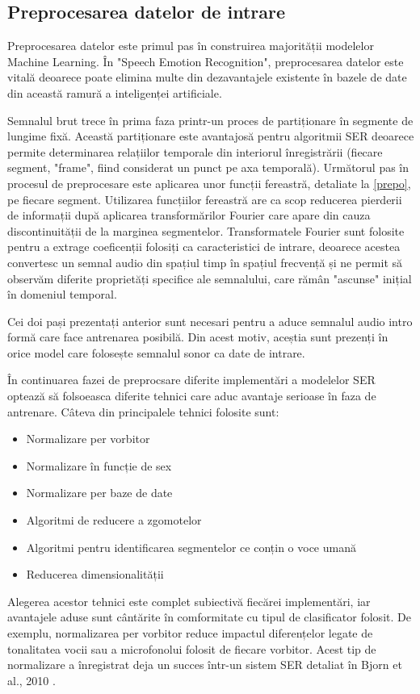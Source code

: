 \documentclass[a4paper,12pt]{book}
\begin{document}
					\subsection{Preprocesarea datelor de intrare}
						Preprocesarea datelor este primul pas în construirea majorității modelelor Machine Learning. În "Speech Emotion Recognition", preprocesarea datelor este vitală deoarece poate elimina multe din dezavantajele existente în bazele de date din această ramură a inteligenței artificiale.\par
						Semnalul brut trece în prima faza printr-un proces de partiționare în segmente de lungime fixă. Această partiționare este avantajosă pentru algoritmii SER deoarece permite determinarea relațiilor temporale din interiorul înregistrării (fiecare segment, "frame", fiind considerat un punct pe axa temporală). Următorul pas în procesul de preprocesare este aplicarea unor funcții fereastră, detaliate la \ref{prepo}, pe fiecare segment. Utilizarea funcțiilor fereastră are ca scop reducerea pierderii de informații după aplicarea transformărilor Fourier care apare din cauza discontinuității de la marginea segmentelor.
						Transformatele Fourier sunt folosite pentru a extrage coeficenții folosiți ca caracteristici de intrare, deoarece acestea convertesc un semnal audio din spațiul timp în spațiul frecvență și ne permit să observăm diferite proprietăți specifice ale semnalului, care rămân "ascunse" inițial în domeniul temporal. \par
						Cei doi pași prezentați anterior sunt necesari pentru a aduce semnalul audio intro formă care face antrenarea posibilă. Din acest motiv, aceștia sunt prezenți în orice model care folosește semnalul sonor ca date de intrare. \par
						În continuarea fazei de preprocsare diferite implementări a modelelor SER optează să folsoeasca diferite tehnici care aduc avantaje serioase în faza de antrenare. Câteva din principalele tehnici folosite sunt:
						\begin{itemize}
							\setlength\itemsep{0pt}
							\setlength{\itemindent}{1.5cm}
							\item Normalizare per vorbitor
							\item Normalizare în funcție de sex
							\item Normalizare per baze de date
							\item Algoritmi de reducere a zgomotelor
							\item Algoritmi pentru identificarea segmentelor ce conțin o voce umană
							\item Reducerea dimensionalității
						\end{itemize}	
						Alegerea acestor tehnici este complet subiectivă fiecărei implementări, iar avantajele aduse sunt cântărite în comformitate cu tipul de clasificator folosit. De exemplu, normalizarea per vorbitor reduce impactul diferențelor legate de tonalitatea vocii sau a microfonolui folosit de fiecare vorbitor. Acest tip de normalizare a înregistrat deja un succes într-un sistem SER detaliat în Bjorn et al., 2010 \cite{spnorm}.
\end{document}
